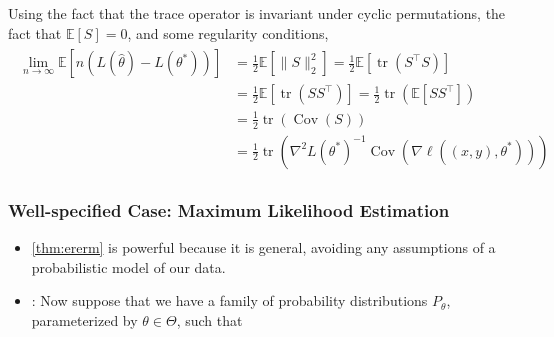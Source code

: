 \documentclass{article}
\begin{document}
Using the fact that the trace operator is invariant under cyclic permutations, the fact that $\mathbb{E}[S]=0$, and some regularity conditions,
\begin{align*}
\begin{aligned}
\lim _{n \rightarrow \infty} \mathbb{E}\left[n\left(L(\hat{\theta})-L\left(\theta^{*}\right)\right)\right] &=\frac{1}{2} \mathbb{E}\left[\|S\|_{2}^{2}\right]=\frac{1}{2} \mathbb{E}\left[\operatorname{tr}\left(S^{\top} S\right)\right] \\
&=\frac{1}{2} \mathbb{E}\left[\operatorname{tr}\left(S S^{\top}\right)\right]=\frac{1}{2} \operatorname{tr}\left(\mathbb{E}\left[S S^{\top}\right]\right) \\
&=\frac{1}{2} \operatorname{tr}(\operatorname{Cov}(S)) \\
&=\frac{1}{2} \operatorname{tr}\left(\nabla^{2} L\left(\theta^{*}\right)^{-1} \operatorname{Cov}\left(\nabla \ell\left((x, y), \theta^{*}\right)\right)\right)
\end{aligned}
\end{align*}
\subsubsection{Well-specified Case: Maximum Likelihood Estimation}
\begin{itemize}
    \item \cref{thm:ererm} is powerful because it is general, avoiding any assumptions of a probabilistic model of our data.
    \item {}: Now suppose that we have a family of probability distributions $P_{\theta}$, parameterized by $\theta \in \Theta$, such that 
\end{itemize}
\end{document}
